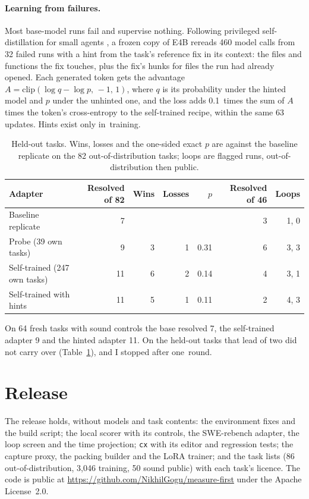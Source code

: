 \paragraph{Learning from failures.} Most base-model runs fail and supervise nothing. Following privileged self-distillation for small agents \citep{sweladder,oprd}, a frozen copy of E4B rereads 460 model calls from 32 failed runs with a hint from the task's reference fix in its context: the files and functions the fix touches, plus the fix's hunks for files the run had already opened. Each generated token gets the advantage $A = \mathrm{clip}(\log q - \log p,\,-1,\,1)$, where $q$ is its probability under the hinted model and $p$ under the unhinted one, and the loss adds 0.1~times the sum of $A$ times the token's cross-entropy to the self-trained recipe, within the same 63 updates. Hints exist only in~training.

\begin{table}[t]
\centering
\caption{Held-out tasks. Wins, losses and the one-sided exact $p$ are against the baseline replicate on the 82 out-of-distribution tasks; loops are flagged runs, out-of-distribution then public.}\label{tab:holdout}
\small
\begin{tabular}{lrrrrrr}
\toprule
Adapter & Resolved of 82 & Wins & Losses & $p$ & Resolved of 46 & Loops \\
\midrule
Baseline replicate & 7 &  &  &  & 3 & 1, 0 \\
Probe (39 own tasks) & 9 & 3 & 1 & 0.31 & 6 & 3, 3 \\
Self-trained (247 own tasks) & 11 & 6 & 2 & 0.14 & 4 & 3, 1 \\
Self-trained with hints & 11 & 5 & 1 & 0.11 & 2 & 4, 3 \\
\bottomrule
\end{tabular}
\end{table}

On 64 fresh tasks with sound controls the base resolved 7, the self-trained adapter 9 and the hinted adapter 11. On the held-out tasks that lead of two did not carry over (Table~\ref{tab:holdout}), and I stopped after one~round.


\section{Release}\label{sec:release}

The release holds, without models and task contents: the environment fixes and the build script; the local scorer with its controls, the SWE-rebench adapter, the loop screen and the time projection; \texttt{cx} with its editor and regression tests; the capture proxy, the packing builder and the LoRA trainer; and the task lists (86 out-of-distribution, 3,046 training, 50 sound public) with each task's licence. The code is public at \mbox{\url{https://github.com/NikhilGogu/measure-first}} under the Apache License~2.0.


